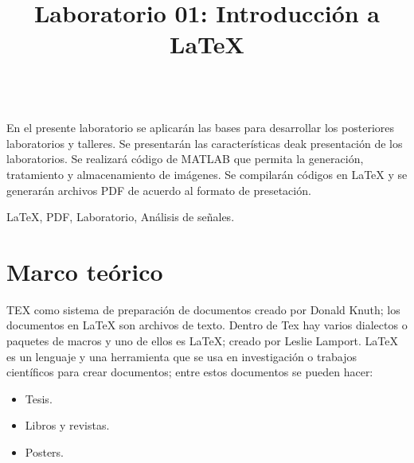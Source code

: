 \documentclass[conference,compsoc,onecolumn]{IEEEtran}
\begin{document}
\title{\normalfont Laboratorio 01: Introducción a \LaTeX{}}
\author{
}


 \maketitle
\IEEEoverridecommandlockouts
\IEEEpeerreviewmaketitle
    \\
\normalfont  \flushleft En el presente laboratorio se aplicarán las bases para desarrollar los posteriores laboratorios y talleres. Se presentarán las características deak presentación de los laboratorios. Se realizará código de MATLAB que permita la generación, tratamiento y almacenamiento de imágenes. Se compilarán códigos en \LaTeX{} y se generarán archivos
PDF de acuerdo al formato de presetación.



\begin{IEEEkeywords}
  \normalfont  \LaTeX{}, PDF, Laboratorio, Análisis de señales.
\end{IEEEkeywords}


\section{\normalfont Marco teórico}
\label{sec:introduction}
TEX como sistema de preparación de documentos creado por Donald Knuth; los documentos en \LaTeX{} son archivos de texto. Dentro de Tex hay varios dialectos o paquetes de macros y uno de ellos es \LaTeX{}; creado por Leslie Lamport.  
\LaTeX{} es un lenguaje y una herramienta que se usa en investigación o trabajos científicos para crear documentos; entre estos documentos se pueden hacer:
\begin{itemize}
    \item Tesis.
    \item Libros y revistas.
    \item Posters.
\end{itemize}
\end{document}
